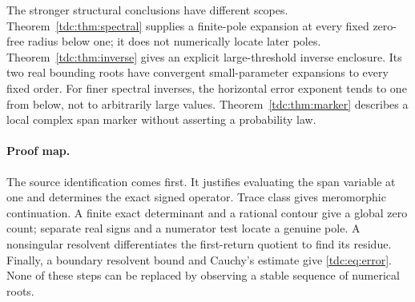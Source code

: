 \documentclass[11pt]{article}
\theoremstyle{definition}\newtheorem{definition}[theorem]{Definition}
\theoremstyle{remark}\newtheorem{remark}[theorem]{Remark}
\begin{document}
The stronger structural conclusions have different scopes. Theorem~\ref{tdc:thm:spectral} supplies a finite-pole expansion at every fixed zero-free radius below one; it does not numerically locate later poles. Theorem~\ref{tdc:thm:inverse} gives an explicit large-threshold inverse enclosure. Its two real bounding roots have convergent small-parameter expansions to every fixed order. For finer spectral inverses, the horizontal error exponent tends to one from below, not to arbitrarily large values. Theorem~\ref{tdc:thm:marker} describes a local complex span marker without asserting a probability law.

\paragraph{Proof map.}
The source identification comes first. It justifies evaluating the span variable at one and determines the exact signed operator. Trace class gives meromorphic continuation. A finite exact determinant and a rational contour give a global zero count; separate real signs and a numerator test locate a genuine pole. A nonsingular resolvent differentiates the first-return quotient to find its residue. Finally, a boundary resolvent bound and Cauchy's estimate give \eqref{tdc:eq:error}. None of these steps can be replaced by observing a stable sequence of numerical roots.
\end{document}
